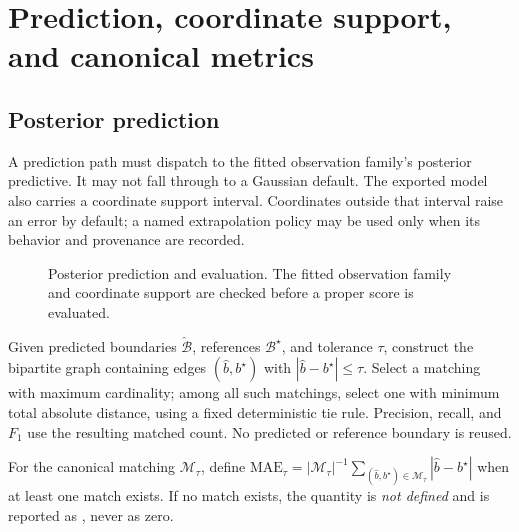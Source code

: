 \chapter{Prediction, coordinate support, and canonical metrics}
\label{ch:prediction}

\section{Posterior prediction}
A prediction path must dispatch to the fitted observation family's posterior predictive. It may not
fall through to a Gaussian default. The exported model also carries a coordinate support interval.
Coordinates outside that interval raise an error by default; a named extrapolation policy may be
used only when its behavior and provenance are recorded.

\begin{figure}[H]
\centering
\resizebox{0.96\textwidth}{!}{}
\caption{Posterior prediction and evaluation. The fitted observation family and coordinate support are checked before a proper score is evaluated.}
\label{fig:posterior-prediction}
\end{figure}

\begin{definition}
\label{def:metric-f1}
Given predicted boundaries $\widehat{\mathcal B}$, references $\mathcal B^\star$, and tolerance
$\tau$, construct the bipartite graph containing edges $(\widehat b,b^\star)$ with
$|\widehat b-b^\star|\le\tau$. Select a matching with maximum cardinality; among all such matchings,
select one with minimum total absolute distance, using a fixed deterministic tie rule. Precision,
recall, and $F_1$ use the resulting matched count. No predicted or reference boundary is reused.
\end{definition}

\begin{definition}
\label{def:metric-mae}
For the canonical matching $\mathcal M_\tau$, define
$\mathrm{MAE}_\tau=|\mathcal M_\tau|^{-1}\sum_{(\widehat b,b^\star)\in\mathcal M_\tau}
|\widehat b-b^\star|$ when at least one match exists. If no match exists, the quantity is
\emph{not defined} and is reported as \NA, never as zero.
\end{definition}

